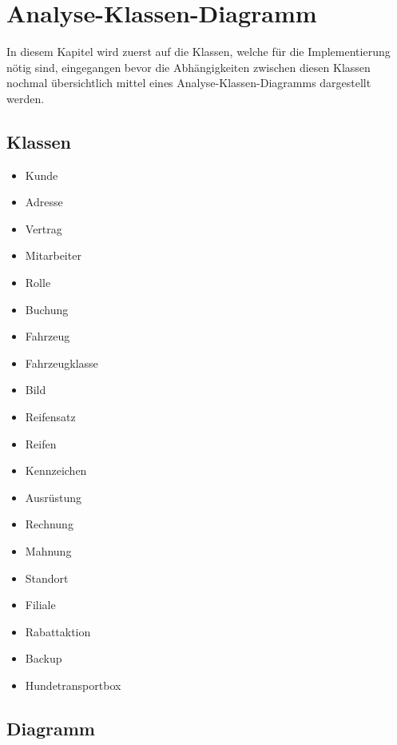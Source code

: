 \chapter{Analyse-Klassen-Diagramm}

In diesem Kapitel wird zuerst auf die Klassen, welche für die Implementierung nötig sind, eingegangen bevor die Abhängigkeiten zwischen diesen Klassen nochmal übersichtlich mittel eines Analyse-Klassen-Diagramms dargestellt werden.

\section{Klassen}
\begin{multicols}{2}
\begin{itemize}
    \item Kunde
    \item Adresse
    \item Vertrag
    \item Mitarbeiter
    \item Rolle
    \item Buchung
    \item Fahrzeug
    \item Fahrzeugklasse
    \item Bild
    \item Reifensatz
    \item Reifen
    \item Kennzeichen
    \item Ausrüstung
    \item Rechnung
    \item Mahnung
    \item Standort
    \item Filiale
    \item Rabattaktion
    \item Backup
    \item Hundetransportbox
\end{itemize}
\end{multicols}

\newpage

\section{Diagramm}

